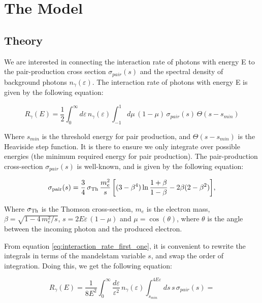 \chapter{The Model}
\label{chap:The Model}

\section{Theory}

We are interested in connecting the interaction rate of photons with energy E to the pair-production cross section $\sigma_{pair}(s)$ and the spectral density of background photons $n_{\gamma}(\varepsilon)$. The interaction rate of photons with energy E is given by the following equation:

\begin{equation}
    R_{\gamma}(E) = \frac{1}{2}\int_{0}^{\infty}d\varepsilon \,n_{\gamma}(\varepsilon)\int_{-1}^{1}d\mu\,(1-\mu)\,\sigma_{pair}(s)\,\Theta(s-s_{min})
    \label{eq:interaction_rate_first_one}
\end{equation}

Where $s_{min}$ is the threshold energy for pair production, and $\Theta(s-s_{min})$ is the Heaviside step function. It is there to ensure we only integrate over possible energies (the minimum required energy for pair production). The pair-production cross-section $\sigma_{pair}(s)$ is well-known, and is given by the following equation:

\begin{equation}
    \sigma_{\rm pair}(s)=\frac{3}{4}\,\sigma_{{\rm Th}}\, \frac{m_e^2}{s}
     \left[(3-\beta^{4})\ln\frac{1+\beta}{1-\beta}-2\beta(2-\beta^{2})\right]\!,
    \label{eq:sigma-pair}
\end{equation}

Where $\sigma_{\rm Th}$ is the Thomson cross-section, $m_e$ is the electron mass, $\beta = \sqrt{1-4\,m_e^2/s}$, $s = 2E\varepsilon\,(1-\mu)$ and $\mu = \cos(\theta)$, where $\theta$ is the angle between the incoming photon and the produced electron.

From equation \ref{eq:interaction_rate_first_one}, it is convenient to rewrite the integrals in terms of the mandelstam variable $s$, and swap the order of integration. Doing this, we get the following equation:

\newpage

\begin{equation*}
    R_{\gamma}(E) = \frac{1}{8E^2}\int_{0}^{\infty}\frac{d\varepsilon}{\varepsilon^2}\,n_{\gamma}(\varepsilon)\int_{s_{min}}^{4E\varepsilon}ds\,s\,\sigma_{pair}(s) =
    \label{eq:interaction_rate_second_one}
\end{equation*}


